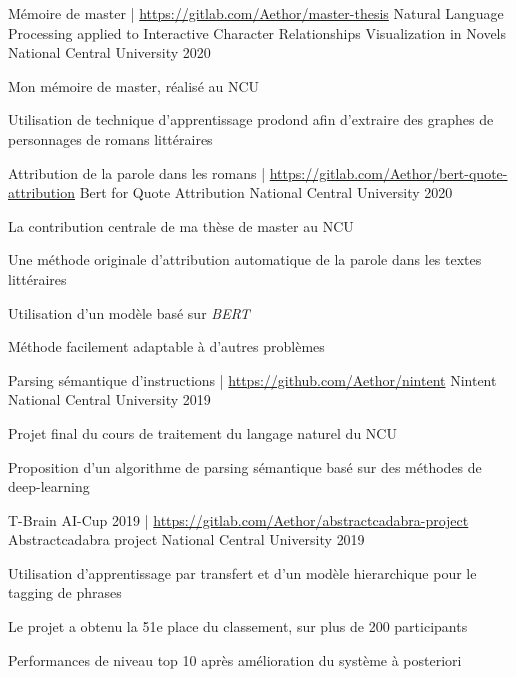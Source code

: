 \documentclass[12pt, a4paper]{awesome-cv}
\begin{document}
\begin{cventries}

  \cventry
  {Mémoire de master | \url{https://gitlab.com/Aethor/master-thesis}}
  {Natural Language Processing applied to Interactive Character Relationships Visualization in Novels}
  {National Central University}
  {2020}
  {
    \begin{cvitems}
      \item Mon mémoire de master, réalisé au NCU
      \item Utilisation de technique d'apprentissage prodond afin d'extraire des graphes de personnages de romans littéraires
    \end{cvitems}
  }

  \cventry
  {Attribution de la parole dans les romans | \url{https://gitlab.com/Aethor/bert-quote-attribution}}
  {Bert for Quote Attribution}
  {National Central University}
  {2020}
  {
    \begin{cvitems}
      \item La contribution centrale de ma thèse de master au NCU
      \item Une méthode originale d'attribution automatique de la parole dans les textes littéraires
      \item Utilisation d'un modèle basé sur \textit{BERT}
      \item Méthode facilement adaptable à d'autres problèmes
    \end{cvitems}
  }

  \cventry
  {Parsing sémantique d'instructions | \url{https://github.com/Aethor/nintent}}
  {Nintent}
  {National Central University}
  {2019}
  {
    \begin{cvitems}
      \item Projet final du cours de traitement du langage naturel du NCU
      \item Proposition d'un algorithme de parsing sémantique basé sur des méthodes de deep-learning
    \end{cvitems}
  }

  \cventry
  {T-Brain AI-Cup 2019 | \url{https://gitlab.com/Aethor/abstractcadabra-project}}
  {Abstractcadabra project}
  {National Central University}
  {2019}
  {
    \begin{cvitems}
      \item Utilisation d'apprentissage par transfert et d'un modèle hierarchique pour le tagging de phrases
      \item Le projet a obtenu la 51e place du classement, sur plus de 200 participants
      \item Performances de niveau top 10 après amélioration du système à posteriori
    \end{cvitems}
  }


\end{cventries}
\end{document}
